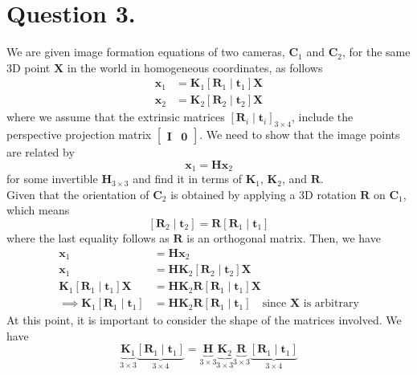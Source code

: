 \documentclass[10pt]{article}
\newcommand{\orientation}[1]{\left[ \mathbf{R}_{#1} \mid \mathbf{t}_{#1} \right]}
\begin{document}
    \section*{\textbf{Question 3.}}
    We are given image formation equations of two cameras, $\mathbf{C}_{1}$ and
    $\mathbf{C}_{2}$, for the same 3D point $\mathbf{X}$ in the world in homogeneous
    coordinates, as follows
    \begin{align*}
        \mathbf{x}_{1} &= \mathbf{K}_{1} \orientation{1} \mathbf{X} \\
        \mathbf{x}_{2} &= \mathbf{K}_{2} \orientation{2} \mathbf{X}
    \end{align*}
    where we assume that the extrinsic matrices
    $\left[ \mathbf{R}_{i} \mid \mathbf{t}_{i} \right]_{3 \times 4}$, include the perspective projection
    matrix $\begin{bmatrix} \mathbf{I} & \mathbf{0} \end{bmatrix}$. We need to show that the image
    points are related by
    \begin{equation*}
        \mathbf{x}_{1} = \mathbf{H} \mathbf{x}_{2}
    \end{equation*}
    for some invertible $\mathbf{H}_{3 \times 3}$ and find it in terms of $\mathbf{K}_{1}$,
    $\mathbf{K}_{2}$, and $\mathbf{R}$. \\
    Given that the orientation of $\mathbf{C}_{2}$ is obtained by applying a 3D rotation
    $\mathbf{R}$ on $\mathbf{C}_{1}$, which means
    \begin{equation*}
        \orientation{2} = \mathbf{R} \orientation{1}
   \end{equation*}
    where the last equality follows as $\mathbf{R}$ is an orthogonal matrix. Then, we have
    \begin{align*}
            \mathbf{x}_{1} &= \mathbf{H} \mathbf{x}_{2} \\
            \mathbf{x}_{1} &= \mathbf{H} \mathbf{K}_{2} \orientation{2} \mathbf{X} \\
            \mathbf{K}_{1} \orientation{1} \mathbf{X} &= \mathbf{H} \mathbf{K}_{2} \mathbf{R}
            \orientation{1} \mathbf{X} \\
            \implies \mathbf{K}_{1} \orientation{1} &= \mathbf{H} \mathbf{K}_{2} \mathbf{R} \orientation{1}
            \quad \text{since } \mathbf{X} \text{ is arbitrary}
    \end{align*}
    At this point, it is important to consider the shape of the matrices involved. We have
    \begin{equation*}
        \underbrace{\mathbf{K}_{1}}_{3 \times 3} \underbrace{\orientation{1}}_{3 \times 4} =
        \underbrace{\mathbf{H}}_{3 \times 3} \underbrace{\mathbf{K}_{2}}_{3 \times 3}
        \underbrace{\mathbf{R}}_{3 \times 3} \underbrace{\orientation{1}}_{3 \times 4}
    \end{equation*}
\end{document}

